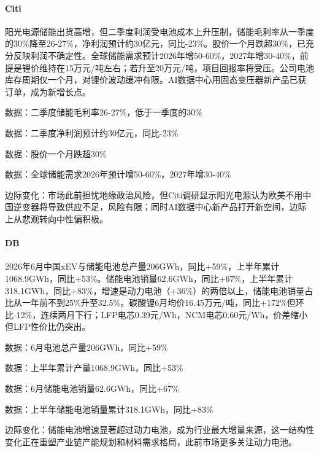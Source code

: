\documentclass[11pt]{ctexart}
\begin{document}
\paragraph{Citi} 阳光电源储能出货高增，但二季度利润受电池成本上升压制，储能毛利率从一季度的30\%降至26-27\%，净利润预计约30亿元，同比-23\%。股价一个月跌超30\%，已充分反映利润不确定性。全球储能需求预计2026年增50-60\%，2027年增30-40\%，前提是锂价维持在15万元/吨左右；若升至20万元/吨，项目回报率将受压。公司电池库存周期仅一个月，对锂价波动缓冲有限。AI数据中心用固态变压器新产品已获订单，成为新增长点。
{\small\color{refgray}数据：二季度储能毛利率26-27\%，低于一季度的30\%\par}
{\small\color{refgray}数据：二季度净利润预计约30亿元，同比-23\%\par}
{\small\color{refgray}数据：股价一个月跌超30\%\par}
{\small\color{refgray}数据：全球储能需求2026年预计增50-60\%，2027年增30-40\%\par}
{\small\color{refgray}边际变化：市场此前担忧地缘政治风险，但Citi调研显示阳光电源认为欧美不用中国逆变器将导致供应不足，风险有限；同时AI数据中心新产品打开新空间，边际上从悲观转向中性偏积极。\par}
\paragraph{DB} 2026年6月中国xEV与储能电池总产量206GWh，同比+59\%，上半年累计1068.9GWh，同比+53\%。储能电池销量62.6GWh，同比+67\%，上半年累计318.1GWh，同比+83\%，增速是动力电池（+36\%）的两倍以上，储能电池销量占比从一年前不到25\%升至32.5\%。碳酸锂6月均价16.45万元/吨，同比+172\%但环比-12\%，连续两月下行；LFP电芯0.39元/Wh，NCM电芯0.60元/Wh，价差缩小但LFP性价比仍突出。
{\small\color{refgray}数据：6月电池总产量206GWh，同比+59\%\par}
{\small\color{refgray}数据：上半年累计产量1068.9GWh，同比+53\%\par}
{\small\color{refgray}数据：6月储能电池销量62.6GWh，同比+67\%\par}
{\small\color{refgray}数据：上半年储能电池销量累计318.1GWh，同比+83\%\par}
{\small\color{refgray}边际变化：储能电池增速显著超过动力电池，成为行业最大增量来源，这一结构性变化正在重塑产业链产能规划和材料需求格局，此前市场更多关注动力电池。\par}
\end{document}
